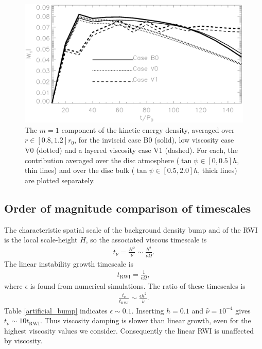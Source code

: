 \begin{figure}
  \centering
  \includegraphics[width=\linewidth]{figures/pdisk_kerz_cases_bump}
  \caption{The $m=1$ component of the kinetic energy density, averaged
    over $r\in[0.8,1.2]r_0$, for the inviscid case B0 (solid), low
    viscosity case V0 (dotted) and a layered viscosity case V1 (dashed). 
    For each, the contribution 
    averaged over the disc atmosphere ($\tan{\psi}\in[0,0.5]h$, thin
    lines) and over the
    disc bulk ($\tan{\psi}\in[0.5,2.0]h$, thick lines) are plotted
    separately. 
    \label{bump_energy}}
\end{figure}



\subsection{Order of magnitude comparison of timescales}

The characteristic spatial scale of the background density bump and of
the RWI is the local scale-height $H$, so the associated
viscous timescale is    
\begin{align}
  t_\nu = \frac{H^2}{\nu}\sim \frac{h^2}{\hat{\nu}\Omega}. 
\end{align}
The linear instability growth timescale is
\begin{align}
  t_\mathrm{RWI} = \frac{1}{\epsilon \Omega},
\end{align}
where $\epsilon$ is found from numerical simulations.   
The ratio of these timescales is
\begin{align}
  \frac{t_\nu}{t_\mathrm{RWI}} \sim \frac{\epsilon h^2}{\hat{\nu}}.
\end{align}
Table \ref{artificial_bump} indicates $\epsilon \sim 0.1$. 
Inserting $h=0.1$ and $\hat{\nu}=10^{-4}$ gives $t_\nu \sim 10
t_\mathrm{RWI}$. Thus viscosity damping is slower than linear
growth, even for the highest viscosity values we consider. 
Consequently the linear RWI is unaffected by viscosity. 


